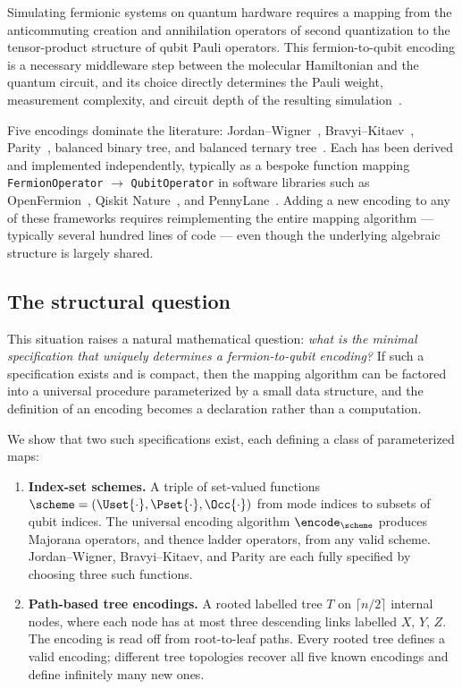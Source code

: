 
Simulating fermionic systems on quantum hardware requires a mapping
from the anticommuting creation and annihilation operators of second
quantization to the tensor-product structure of qubit Pauli operators.
This fermion-to-qubit encoding is a necessary middleware step between
the molecular Hamiltonian and the quantum circuit, and its choice
directly determines the Pauli weight, measurement complexity, and
circuit depth of the resulting simulation~\cite{tranter2015,
havlicek2017}.

Five encodings dominate the literature: Jordan--Wigner~\cite{jordan1928},
Bravyi--Kitaev~\cite{bravyi2002, seeley2012}, Parity~\cite{seeley2012,
bravyi2017tapering}, balanced binary tree, and balanced ternary
tree~\cite{jiang2020, miller2023bonsai}.  Each has been derived and
implemented independently, typically as a bespoke function mapping
\texttt{FermionOperator} $\to$ \texttt{QubitOperator} in software
libraries such as OpenFermion~\cite{mcclean2020}, Qiskit
Nature~\cite{qiskit2023}, and PennyLane~\cite{bergholm2022}.  Adding a
new encoding to any of these frameworks requires reimplementing the
entire mapping algorithm --- typically several hundred lines of code ---
even though the underlying algebraic structure is largely shared.

\subsection{The structural question}

This situation raises a natural mathematical question: \emph{what is the
minimal specification that uniquely determines a fermion-to-qubit
encoding?}  If such a specification exists and is compact, then the
mapping algorithm can be factored into a universal procedure
parameterized by a small data structure, and the definition of an
encoding becomes a declaration rather than a computation.

We show that two such specifications exist, each defining a class of
parameterized maps:

\begin{enumerate}
  \item \textbf{Index-set schemes.}  A triple of set-valued functions
    $\scheme = (\Uset{\cdot}, \Pset{\cdot}, \Occ{\cdot})$ from mode
    indices to subsets of qubit indices.  The universal encoding
    algorithm $\encode_\scheme$ produces Majorana operators, and thence
    ladder operators, from any valid scheme.  Jordan--Wigner,
    Bravyi--Kitaev, and Parity are each fully specified by choosing
    three such functions.

  \item \textbf{Path-based tree encodings.}  A rooted labelled tree $T$
    on $\lceil n/2 \rceil$ internal nodes, where each node has at most
    three descending links labelled $X$, $Y$, $Z$.  The encoding is
    read off from root-to-leaf paths.  Every rooted tree defines a valid
    encoding; different tree topologies recover all five known encodings
    and define infinitely many new ones.
\end{enumerate}

